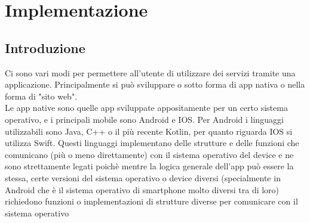 \chapter{Implementazione}

\section{Introduzione}

Ci sono vari modi per permettere all'utente di utilizzare dei servizi tramite una applicazione. Principalmente si può sviluppare o sotto forma di app nativa o nella forma di "sito web".\\ 

\noindent
Le app native sono quelle app sviluppate appositamente per un certo sistema operativo, e i principali mobile sono Android e IOS. Per Android i linguaggi utilizzabili sono Java, C++ o il più recente Kotlin, per quanto riguarda IOS si utilizza Swift. Questi linguaggi implementano delle strutture e delle funzioni che comunicano (più o meno direttamente) con il sistema operativo del device e ne sono strettamente legati poichè mentre la logica generale dell'app può essere la stessa, certe versioni del sistema operativo o device diversi (specialmente in Android che è il sistema operativo di smartphone molto diversi tra di loro) richiedono funzioni o implementazioni di strutture diverse per comunicare con il sistema operativo\\ 

